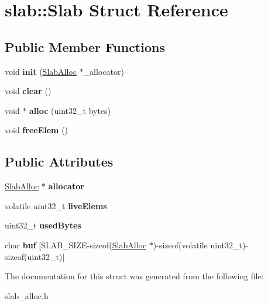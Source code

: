 \hypertarget{structslab_1_1Slab}{\section{slab\-:\-:Slab Struct Reference}
\label{structslab_1_1Slab}
}
\subsection*{Public Member Functions}
\begin{DoxyCompactItemize}
\item 
\hypertarget{structslab_1_1Slab_a8f64c1f7cee46ccc745f8df77950b777}{void {\bfseries init} (\hyperlink{classslab_1_1SlabAlloc}{Slab\-Alloc} $\ast$\-\_\-allocator)}\label{structslab_1_1Slab_a8f64c1f7cee46ccc745f8df77950b777}

\item 
\hypertarget{structslab_1_1Slab_ab410f9deef5929bfdfd91ddcf9092b29}{void {\bfseries clear} ()}\label{structslab_1_1Slab_ab410f9deef5929bfdfd91ddcf9092b29}

\item 
\hypertarget{structslab_1_1Slab_a38c4f66a7a28c517cbea420f3a4c2324}{void $\ast$ {\bfseries alloc} (uint32\-\_\-t bytes)}\label{structslab_1_1Slab_a38c4f66a7a28c517cbea420f3a4c2324}

\item 
\hypertarget{structslab_1_1Slab_a2c0214e6118932afa9f3f9c5bf53ccd3}{void {\bfseries free\-Elem} ()}\label{structslab_1_1Slab_a2c0214e6118932afa9f3f9c5bf53ccd3}

\end{DoxyCompactItemize}
\subsection*{Public Attributes}
\begin{DoxyCompactItemize}
\item 
\hypertarget{structslab_1_1Slab_a49f847c46dc7f3da923e4dffa2a18194}{\hyperlink{classslab_1_1SlabAlloc}{Slab\-Alloc} $\ast$ {\bfseries allocator}}\label{structslab_1_1Slab_a49f847c46dc7f3da923e4dffa2a18194}

\item 
\hypertarget{structslab_1_1Slab_ab4a4d8bb35fb3ab67034448e6d8d6fc1}{volatile uint32\-\_\-t {\bfseries live\-Elems}}\label{structslab_1_1Slab_ab4a4d8bb35fb3ab67034448e6d8d6fc1}

\item 
\hypertarget{structslab_1_1Slab_a1a789c2f9ac7d27f4e123c0bd6c20580}{uint32\-\_\-t {\bfseries used\-Bytes}}\label{structslab_1_1Slab_a1a789c2f9ac7d27f4e123c0bd6c20580}

\item 
\hypertarget{structslab_1_1Slab_a1924cfc0a6516a49d5ca61997abf2030}{char {\bfseries buf} \mbox{[}S\-L\-A\-B\-\_\-\-S\-I\-Z\-E-\/sizeof(\hyperlink{classslab_1_1SlabAlloc}{Slab\-Alloc} $\ast$)-\/sizeof(volatile uint32\-\_\-t)-\/sizeof(uint32\-\_\-t)\mbox{]}}\label{structslab_1_1Slab_a1924cfc0a6516a49d5ca61997abf2030}

\end{DoxyCompactItemize}


The documentation for this struct was generated from the following file\-:\begin{DoxyCompactItemize}
\item 
slab\-\_\-alloc.\-h\end{DoxyCompactItemize}
